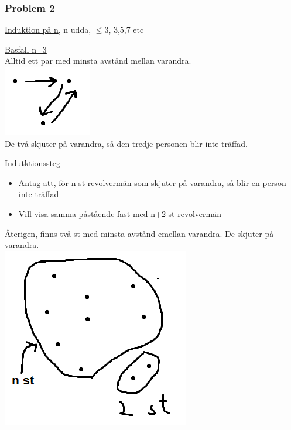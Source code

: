 \documentclass{article}
\begin{document}
            \subsubsection{Problem 2}
                \underline{Induktion på n}, n udda, $\leq 3$, 3,5,7 etc\\
                \begin{tabbing}
                    \underline{Basfall n=3}\=\\
                    \>Alltid ett par med minsta avstånd mellan varandra.\\
                    \includegraphics{img01.png}\\
                    \>De två skjuter på varandra, så den tredje personen blir inte träffad.
                \end{tabbing}
                \underline{Indutktionssteg}
                \begin{itemize}
                    \item Antag att, för n st revolvermän som skjuter på varandra, 
                        så blir en person inte träffad
                    \item Vill visa samma påstående fast med n+2 st revolvermän
                \end{itemize}
                Återigen, finns två st med minsta avstånd emellan varandra. De skjuter på varandra.\\
                \includegraphics[scale=0.5]{img02.png}\\
\end{document}
